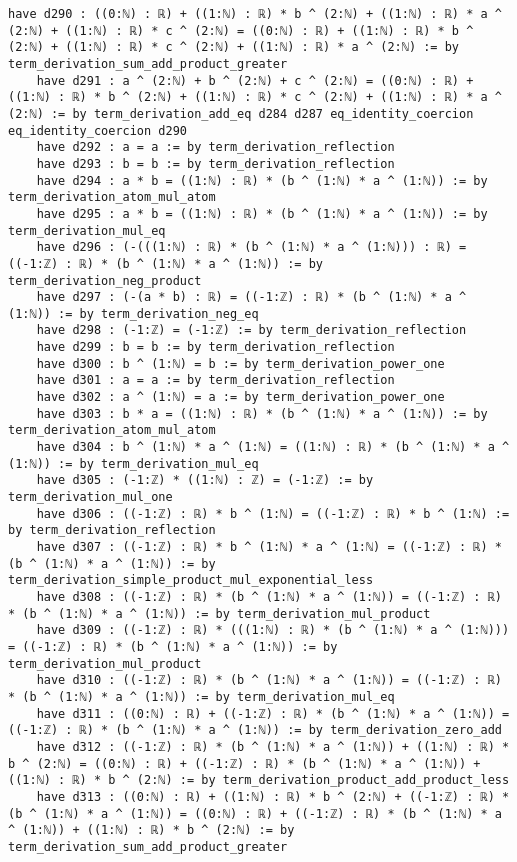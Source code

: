 \documentclass{article}
\begin{document}
\begin{tcolorbox}[colback=white!10, width=\linewidth]
\begin{lstlisting}[language=Lean4]
    have d290 : ((0:ℕ) : ℝ) + ((1:ℕ) : ℝ) * b ^ (2:ℕ) + ((1:ℕ) : ℝ) * a ^ (2:ℕ) + ((1:ℕ) : ℝ) * c ^ (2:ℕ) = ((0:ℕ) : ℝ) + ((1:ℕ) : ℝ) * b ^ (2:ℕ) + ((1:ℕ) : ℝ) * c ^ (2:ℕ) + ((1:ℕ) : ℝ) * a ^ (2:ℕ) := by term_derivation_sum_add_product_greater
    have d291 : a ^ (2:ℕ) + b ^ (2:ℕ) + c ^ (2:ℕ) = ((0:ℕ) : ℝ) + ((1:ℕ) : ℝ) * b ^ (2:ℕ) + ((1:ℕ) : ℝ) * c ^ (2:ℕ) + ((1:ℕ) : ℝ) * a ^ (2:ℕ) := by term_derivation_add_eq d284 d287 eq_identity_coercion eq_identity_coercion d290
    have d292 : a = a := by term_derivation_reflection
    have d293 : b = b := by term_derivation_reflection
    have d294 : a * b = ((1:ℕ) : ℝ) * (b ^ (1:ℕ) * a ^ (1:ℕ)) := by term_derivation_atom_mul_atom
    have d295 : a * b = ((1:ℕ) : ℝ) * (b ^ (1:ℕ) * a ^ (1:ℕ)) := by term_derivation_mul_eq
    have d296 : (-(((1:ℕ) : ℝ) * (b ^ (1:ℕ) * a ^ (1:ℕ))) : ℝ) = ((-1:ℤ) : ℝ) * (b ^ (1:ℕ) * a ^ (1:ℕ)) := by term_derivation_neg_product
    have d297 : (-(a * b) : ℝ) = ((-1:ℤ) : ℝ) * (b ^ (1:ℕ) * a ^ (1:ℕ)) := by term_derivation_neg_eq
    have d298 : (-1:ℤ) = (-1:ℤ) := by term_derivation_reflection
    have d299 : b = b := by term_derivation_reflection
    have d300 : b ^ (1:ℕ) = b := by term_derivation_power_one
    have d301 : a = a := by term_derivation_reflection
    have d302 : a ^ (1:ℕ) = a := by term_derivation_power_one
    have d303 : b * a = ((1:ℕ) : ℝ) * (b ^ (1:ℕ) * a ^ (1:ℕ)) := by term_derivation_atom_mul_atom
    have d304 : b ^ (1:ℕ) * a ^ (1:ℕ) = ((1:ℕ) : ℝ) * (b ^ (1:ℕ) * a ^ (1:ℕ)) := by term_derivation_mul_eq
    have d305 : (-1:ℤ) * ((1:ℕ) : ℤ) = (-1:ℤ) := by term_derivation_mul_one
    have d306 : ((-1:ℤ) : ℝ) * b ^ (1:ℕ) = ((-1:ℤ) : ℝ) * b ^ (1:ℕ) := by term_derivation_reflection
    have d307 : ((-1:ℤ) : ℝ) * b ^ (1:ℕ) * a ^ (1:ℕ) = ((-1:ℤ) : ℝ) * (b ^ (1:ℕ) * a ^ (1:ℕ)) := by term_derivation_simple_product_mul_exponential_less
    have d308 : ((-1:ℤ) : ℝ) * (b ^ (1:ℕ) * a ^ (1:ℕ)) = ((-1:ℤ) : ℝ) * (b ^ (1:ℕ) * a ^ (1:ℕ)) := by term_derivation_mul_product
    have d309 : ((-1:ℤ) : ℝ) * (((1:ℕ) : ℝ) * (b ^ (1:ℕ) * a ^ (1:ℕ))) = ((-1:ℤ) : ℝ) * (b ^ (1:ℕ) * a ^ (1:ℕ)) := by term_derivation_mul_product
    have d310 : ((-1:ℤ) : ℝ) * (b ^ (1:ℕ) * a ^ (1:ℕ)) = ((-1:ℤ) : ℝ) * (b ^ (1:ℕ) * a ^ (1:ℕ)) := by term_derivation_mul_eq
    have d311 : ((0:ℕ) : ℝ) + ((-1:ℤ) : ℝ) * (b ^ (1:ℕ) * a ^ (1:ℕ)) = ((-1:ℤ) : ℝ) * (b ^ (1:ℕ) * a ^ (1:ℕ)) := by term_derivation_zero_add
    have d312 : ((-1:ℤ) : ℝ) * (b ^ (1:ℕ) * a ^ (1:ℕ)) + ((1:ℕ) : ℝ) * b ^ (2:ℕ) = ((0:ℕ) : ℝ) + ((-1:ℤ) : ℝ) * (b ^ (1:ℕ) * a ^ (1:ℕ)) + ((1:ℕ) : ℝ) * b ^ (2:ℕ) := by term_derivation_product_add_product_less
    have d313 : ((0:ℕ) : ℝ) + ((1:ℕ) : ℝ) * b ^ (2:ℕ) + ((-1:ℤ) : ℝ) * (b ^ (1:ℕ) * a ^ (1:ℕ)) = ((0:ℕ) : ℝ) + ((-1:ℤ) : ℝ) * (b ^ (1:ℕ) * a ^ (1:ℕ)) + ((1:ℕ) : ℝ) * b ^ (2:ℕ) := by term_derivation_sum_add_product_greater

\end{lstlisting}
\end{tcolorbox}
\end{document}
